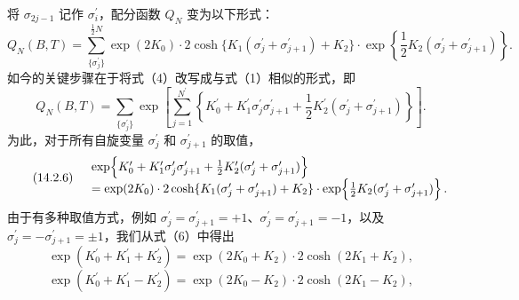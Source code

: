 将 \(\sigma_{2j-1}\) 记作 \(\sigma_{i}^{\prime}\)，配分函数 \(Q_{N}\) 变为以下形式：
\begin{equation}\tag{14.2.4}\label{eq:14.2.4}
Q _ { N } ( B , T ) = \sum _ { \{ \sigma _ { j } ^{\prime} \} } ^{\frac { 1} { 2 } N } \exp ( 2 K _ { 0 } ) \cdot 2 \cosh \{ K _ { 1 } ( \sigma _ { j } ^{\prime} + \sigma _ { j + 1 } ^{\prime} ) + K _ { 2 } \} \cdot \exp \left\{ \frac { 1 } { 2 } K _ { 2 } ( \sigma _ { j } ^{\prime} + \sigma _ { j + 1 } ^{\prime} ) \right\} .
\end{equation}
如今的关键步骤在于将式（4）改写成与式（1）相似的形式，即
\begin{equation}\tag{14.2.5}\label{eq:14.2.5}
Q _ { N } ( B , T ) = \sum _ { \{ \sigma _ { j } ^{\prime} \} } \exp \left[ \sum _ { j = 1 } ^{N ^ { \prime} } \left\{ K _ { 0 } ^{\prime} + K _ { 1 } ^{\prime} \sigma _ { j } ^{\prime} \sigma _ { j + 1 } ^{\prime} + \frac { 1 } { 2 } K _ { 2 } ^{\prime} ( \sigma _ { j } ^{\prime} + \sigma _ { j + 1 } ^{\prime} ) \right\} \right] .
\end{equation}
为此，对于所有自旋变量 \(\sigma_{j}^{\prime}\) 和 \(\sigma_{j+1}^{\prime}\) 的取值，
\begin{equation}\tag{14.2.6}\label{eq:14.2.6}
\begin{array}{rl} & { \exp \Bigl \{ K _ { 0 } ^{\prime} + K _ { 1 } ^{\prime} \sigma _ { j } ^{\prime} \sigma _ { j + 1 } ^{\prime} + \frac { 1 } { 2 } K _ { 2 } ^{\prime} ( \sigma _ { j } ^{\prime} + \sigma _ { j + 1 } ^{\prime} ) \Bigr \} } \\& {  = \exp ( 2 K _ { 0 } ) \cdot 2 \cosh \{ K _ { 1 } ( \sigma _ { j } ^{\prime} + \sigma _ { j + 1 } ^{\prime} ) + K _ { 2 } \} \cdot \exp \Bigl \{ \frac { 1 } { 2 } K _ { 2 } ( \sigma _ { j } ^{\prime} + \sigma _ { j + 1 } ^{\prime} ) \Bigr \} \, . } \end{array}
\end{equation}
由于有多种取值方式，例如 \(\sigma_{j}^{\prime}=\sigma_{j+1}^{\prime}=+1\)、\(\sigma_{j}^{\prime}=\sigma_{j+1}^{\prime}=-1\)，以及 \(\sigma_{j}^{\prime}=-\sigma_{j+1}^{\prime}=\pm1\)，我们从式（6）中得出
\begin{equation}\tag{14.2.7}\label{eq:14.2.7}
\exp ( K _ { 0 } ^{\prime} + K _ { 1 } ^{\prime} + K _ { 2 } ^{\prime} ) = \exp ( 2 K _ { 0 } + K _ { 2 } ) \cdot 2 \cosh ( 2 K _ { 1 } + K _ { 2 } ) ,
\end{equation}
\begin{equation}\tag{14.2.8}\label{eq:14.2.8}
\exp ( K _ { 0 } ^{\prime} + K _ { 1 } ^{\prime} - K _ { 2 } ^{\prime} ) = \exp ( 2 K _ { 0 } - K _ { 2 } ) \cdot 2 \cosh ( 2 K _ { 1 } - K _ { 2 } ) ,
\end{equation}
